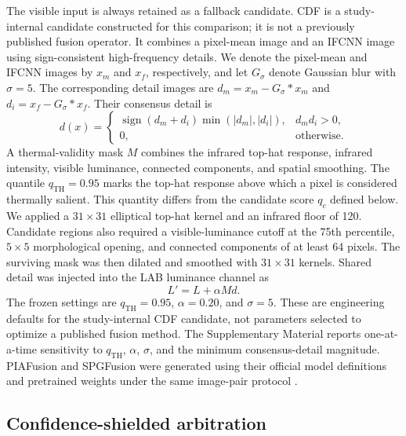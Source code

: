 \documentclass[preprint,11pt]{elsarticle}
\begin{document}
The visible input is always retained as a fallback candidate. CDF is a
study-internal candidate constructed for this comparison; it is not a
previously published fusion operator. It combines a pixel-mean image and an
IFCNN image using sign-consistent high-frequency details. We denote the
pixel-mean and IFCNN images by \(x_m\) and \(x_f\),
respectively, and let \(G_\sigma\) denote Gaussian blur with \(\sigma=5\). The
corresponding detail images are
\(d_m=x_m-G_\sigma*x_m\) and \(d_i=x_f-G_\sigma*x_f\). Their consensus detail
is
\begin{equation}
d(x)=
\begin{cases}
\operatorname{sign}(d_m+d_i)\min(|d_m|,|d_i|), & d_m d_i>0,\\
0, & \text{otherwise}.
\end{cases}
\end{equation}
A thermal-validity mask \(M\) combines the infrared top-hat response, infrared
intensity, visible luminance, connected components, and spatial smoothing. The
quantile \(q_{\mathrm{TH}}=0.95\) marks the top-hat response above which a pixel
is considered thermally salient. This quantity differs from the candidate score
\(q_c\) defined below. We applied a \(31\times31\) elliptical top-hat kernel and
an infrared floor of 120. Candidate regions also required a visible-luminance
cutoff at the 75th percentile, \(5\times5\) morphological opening, and connected
components of at least 64 pixels. The surviving mask was then dilated and
smoothed with \(31\times31\) kernels. Shared detail was injected into the LAB
luminance channel as
\begin{equation}
L' = L + \alpha M d.
\end{equation}
The frozen settings are \(q_{\mathrm{TH}}=0.95\), \(\alpha=0.20\), and
\(\sigma=5\). These are engineering defaults for the study-internal CDF
candidate, not parameters selected to optimize a published fusion method.
The Supplementary Material reports one-at-a-time sensitivity to
\(q_{\mathrm{TH}}\), \(\alpha\), \(\sigma\), and the minimum consensus-detail
magnitude. PIAFusion and SPGFusion were generated using their
official model definitions and pretrained weights under the same image-pair protocol
\cite{zhang2020,tang2022,zhang2026}.

\subsection{Confidence-shielded arbitration}
\end{document}
